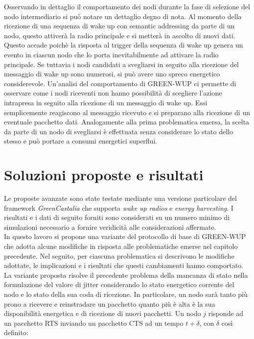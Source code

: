 \documentclass{report}
\begin{document}
Osservando in dettaglio il comportamento dei nodi durante la fase di selezione del nodo intermediario si può notare un dettaglio degno di nota.
Al momento della ricezione di una sequenza di wake up con semantic addressing da parte di un nodo, questo attiverà la radio principale e si metterà in
ascolto di nuovi dati. Questo accade poichè la risposta al trigger della sequenza di wake up genera un evento in ciascun nodo che lo porta inevitabilmente
ad attivare la radio principale. Se tuttavia i nodi candidati a svegliarsi in seguito alla ricezione del messaggio di wake up sono numerosi, si può avere uno
spreco energetico considerevole. Un'analisi del comportamento di GREEN-WUP ci permette di osservare come i nodi riceventi non hanno possibilità di scegliere l'azione
intrapresa in seguito alla ricezione di un messaggio di wake up. Essi semplicemente reagiscono al messaggio ricevuto e si preparano alla ricezione di un
eventuale pacchetto dati. Analogamente alla prima problematica emersa, la scelta da parte di un nodo di svegliarsi è effettuata senza considerare lo stato dello
stesso e può portare a consumi energetici superflui.

\section{Soluzioni proposte e risultati}

Le proposte avanzate sono state testate mediante una versione particolare del framework \emph{GreenCastalia} che supporta \emph{wake up radios}
e \emph{energy harvesting}. I risultati e i dati di seguito forniti sono considerati su un numero minimo di simulazioni
necessario a fornire veridicità alle considerazioni affermate.\\

In questo lavoro si propone una variante del protocollo di base di GREEN-WUP che adotta alcune modifiche in risposta alle problematiche emerse nel capitolo
precedente. Nel seguito, per ciascuna problematica si descrivono le modifiche adottate, le implicazioni e i risultati che questi cambiamenti hanno comportato.\\

La variante proposta risolve il precedente problema della mancanza di stato nella formulazione del valore di jitter considerando lo stato energetico
corrente del nodo e lo stato della sua coda di ricezione. In particolare, un nodo sarà tanto più prono a ricevere e reinstradare un pacchetto quanto
più è alta è la sua disponibilità energetica e di ricezione di nuovi pacchetti. Un nodo $j$ risponde ad un pacchetto RTS inviando un pacchetto CTS
ad un tempo $t+\delta$, con $\delta$ così definito:
\end{document}
